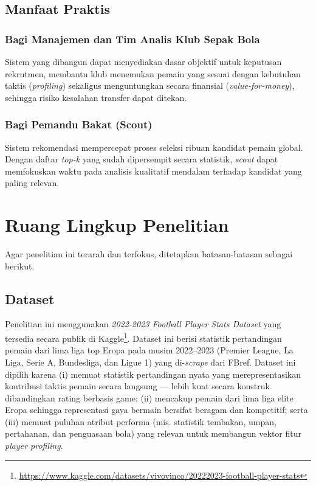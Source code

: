 \subsection{Manfaat Praktis}
\label{subsec:manfaat-praktis}

\subsubsection{Bagi Manajemen dan Tim Analis Klub Sepak Bola}
Sistem yang dibangun dapat menyediakan dasar objektif untuk keputusan rekrutmen, membantu klub menemukan pemain yang sesuai dengan kebutuhan taktis (\emph{profiling}) sekaligus menguntungkan secara finansial (\emph{value-for-money}), sehingga risiko kesalahan transfer dapat ditekan.

\subsubsection{Bagi Pemandu Bakat (Scout)}
Sistem rekomendasi mempercepat proses seleksi ribuan kandidat pemain global. Dengan daftar \emph{top-k} yang sudah dipersempit secara statistik, \emph{scout} dapat memfokuskan waktu pada analisis kualitatif mendalam terhadap kandidat yang paling relevan.

\section{Ruang Lingkup Penelitian}
\label{sec:ruang-lingkup}

Agar penelitian ini terarah dan terfokus, ditetapkan batasan-batasan sebagai berikut.

\subsection{Dataset}
\label{subsec:dataset}

Penelitian ini menggunakan \emph{2022-2023 Football Player Stats Dataset} yang tersedia secara publik di Kaggle\footnote{\url{https://www.kaggle.com/datasets/vivovinco/20222023-football-player-stats}}. Dataset ini berisi statistik pertandingan pemain dari lima liga top Eropa pada musim 2022--2023 (Premier League, La Liga, Serie A, Bundesliga, dan Ligue 1) yang di-\emph{scrape} dari FBref. Dataset ini dipilih karena (i) memuat statistik pertandingan nyata yang merepresentasikan kontribusi taktis pemain secara langsung --- lebih kuat secara konstruk dibandingkan rating berbasis game; (ii) mencakup pemain dari lima liga elite Eropa sehingga representasi gaya bermain bersifat beragam dan kompetitif; serta (iii) memuat puluhan atribut performa (mis. statistik tembakan, umpan, pertahanan, dan penguasaan bola) yang relevan untuk membangun vektor fitur \emph{player profiling}.

